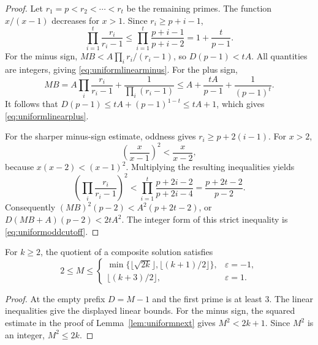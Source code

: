 \begin{proof}
Let $r_1=p<r_2<\cdots<r_t$ be the remaining primes. The function
$x/(x-1)$ decreases for $x>1$. Since $r_i\ge p+i-1$,
\[
 \prod_{i=1}^{t}\frac{r_i}{r_i-1}
 \le\prod_{i=1}^{t}\frac{p+i-1}{p+i-2}
 =1+\frac{t}{p-1}.
\]
For the minus sign, $MB<A\prod_i r_i/(r_i-1)$, so
$D(p-1)<tA$. All quantities are integers, giving
\eqref{eq:uniformlinearminus}. For the plus sign,
\[
 MB=A\prod_i\frac{r_i}{r_i-1}
       +\frac{1}{\prod_i(r_i-1)}
 \le A+\frac{tA}{p-1}+\frac{1}{(p-1)^t}.
\]
It follows that $D(p-1)\le tA+(p-1)^{1-t}\le tA+1$, which gives
\eqref{eq:uniformlinearplus}.

For the sharper minus-sign estimate, oddness gives
$r_i\ge p+2(i-1)$. For $x>2$,
\[
 \left(\frac{x}{x-1}\right)^2<\frac{x}{x-2},
\]
because $x(x-2)<(x-1)^2$. Multiplying the resulting inequalities yields
\[
 \left(\prod_i\frac{r_i}{r_i-1}\right)^2
 <\prod_{i=1}^{t}\frac{p+2i-2}{p+2i-4}
 =\frac{p+2t-2}{p-2}.
\]
Consequently $(MB)^2(p-2)<A^2(p+2t-2)$, or
$D(MB+A)(p-2)<2tA^2$. The integer form of this strict inequality is
\eqref{eq:uniformoddcutoff}.
\end{proof}

\begin{corollary}\label{cor:uniformquotient}
For $k\ge2$, the quotient of a composite solution satisfies
\[
 2\le M\le
 \begin{cases}
 \min\{\lfloor\sqrt{2k}\rfloor,\lfloor(k+1)/2\rfloor\},
       &\varepsilon=-1,\\
 \lfloor(k+3)/2\rfloor,&\varepsilon=1.
 \end{cases}
\]
\end{corollary}

\begin{proof}
At the empty prefix $D=M-1$ and the first prime is at least $3$.
The linear inequalities give the displayed linear bounds. For the minus
sign, the squared estimate in the proof of
Lemma~\ref{lem:uniformnext} gives $M^2<2k+1$. Since $M^2$ is an
integer, $M^2\le2k$.
\end{proof}

